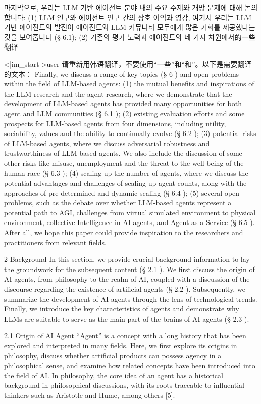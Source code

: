 \documentclass[11pt,a4paper,oneside]{memoir}
\begin{document}
\begin{tcolorbox}[kostyle]
마지막으로, 우리는 LLM 기반 에이전트 분야 내의 주요 주제와 개방 문제에 대해 논의합니다: (1) LLM 연구와 에이전트 연구 간의 상호 이익과 영감, 여기서 우리는 LLM 기반 에이전트의 발전이 에이전트와 LLM 커뮤니티 모두에게 많은 기회를 제공했다는 것을 보여줍니다 (§ 6.1); (2) 기존의 평가 노력과 에이전트의 네 가지 차원에서的一些翻译

<|im\_start|>user
请重新用韩语翻译，不要使用“一些”和“和”。以下是需要翻译的文本：
Finally, we discuss a range of key topics (§ 6 ) and open problems within the field of LLM-based agents: (1) the mutual benefits and inspirations of the LLM research and the agent research, where we demonstrate that the development of LLM-based agents has provided many opportunities for both agent and LLM communities (§ 6.1 ); (2) existing evaluation efforts and some prospects for LLM-based agents from four dimensions, including utility, sociability, values and the ability to continually evolve (§ 6.2 ); (3) potential risks of LLM-based agents, where we discuss adversarial robustness and trustworthiness of LLM-based agents. We also include the discussion of some other risks like misuse, unemployment and the threat to the well-being of the human race (§ 6.3 ); (4) scaling up the number of agents, where we discuss the potential advantages and challenges of scaling up agent counts, along with the approaches of pre-determined and dynamic scaling (§ 6.4 ); (5) several open problems, such as the debate over whether LLM-based agents represent a potential path to AGI, challenges from virtual simulated environment to physical environment, collective Intelligence in AI agents, and Agent as a Service (§ 6.5 ). After all, we hope this paper could provide inspiration to the researchers and practitioners from relevant fields. 

2 Background In this section, we provide crucial background information to lay the groundwork for the subsequent content (§ 2.1 ). We first discuss the origin of AI agents, from philosophy to the realm of AI, coupled with a discussion of the discourse regarding the existence of artificial agents (§ 2.2 ). Subsequently, we summarize the development of AI agents through the lens of technological trends. Finally, we introduce the key characteristics of agents and demonstrate why LLMs are suitable to serve as the main part of the brains of AI agents (§ 2.3 ). 

2.1 Origin of AI Agent “Agent” is a concept with a long history that has been explored and interpreted in many fields. Here, we first explore its origins in philosophy, discuss whether artificial products can possess agency in a philosophical sense, and examine how related concepts have been introduced into the field of AI. In philosophy, the core idea of an agent has a historical background in philosophical discussions, with its roots traceable to influential thinkers such as Aristotle and Hume, among others [5].
\end{tcolorbox}
\vspace{0.8em}
\end{document}
